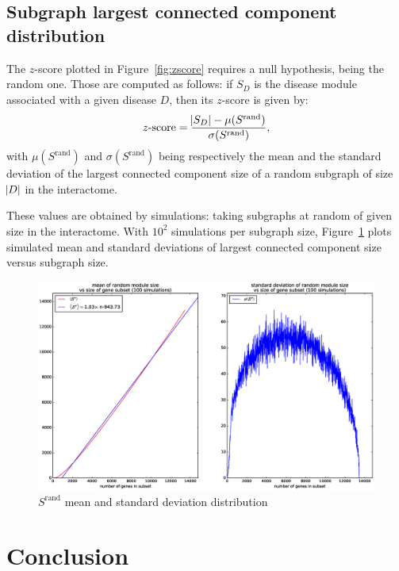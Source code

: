 \documentclass[letterpaper]{article}
\begin{document}
	\subsection{Subgraph largest connected component distribution}
	The $z$-score plotted in Figure~\ref{fig:zscore} requires a null hypothesis, being the random one.
	Those are computed as follows: if $S_D$ is the disease module associated with a given disease $D$,
	then its $z$-score is given by:
	\begin{equation}
		z\text{-score} = \frac {\abs {S_D} - \mu(S^{\text{rand}})}{\sigma(S^{\text{rand}})},
	\end{equation}
	with $\mu(S^{\text{rand}})$ and $\sigma(S^{\text{rand}})$ being respectively the mean and the
	standard deviation of the largest connected component size of a random subgraph of size $\abs D$
	in the interactome.

	These values are obtained by simulations: taking subgraphs at random of given size in the
	interactome. With $10^2$ simulations per subgraph size, Figure~\ref{fig:Srand distribution}
	plots simulated mean and standard deviations of largest connected component size versus
	subgraph size.

	\begin{figure}
		\includegraphics[width=\textwidth]{images/Srand_distribution_100_sims.eps}
		\caption{$S^{\text{rand}}$ mean and standard deviation distribution\label{fig:Srand distribution}}
	\end{figure}


\section{Conclusion}

\footnotesize

{}
\end{document}
